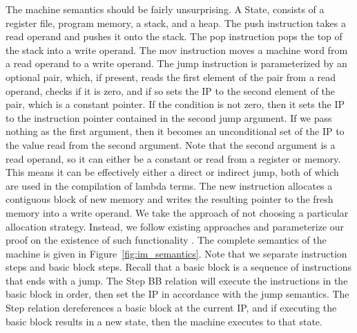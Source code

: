The machine semantics should be fairly unsurprising. A State, consists of a
register file, program memory, a stack, and a heap. The push instruction takes a
read operand and pushes it onto the stack. The pop instruction pops the
top of the stack into a write operand. The mov instruction moves a machine word
from a read operand to a write operand. The jump instruction is parameterized by
an optional pair, which, if present, reads the first element of the pair from a
read operand, checks if it is zero, and if so sets the IP to the second element
of the pair, which is a constant pointer. If the condition is not zero, then it
sets the IP to the instruction pointer contained in the second jump argument. If
we pass nothing as the first argument, then it becomes an unconditional set of
the IP to the value read from the second argument.  Note that the second
argument is a read operand, so it can either be a constant or read from a register
or memory. This means it can be effectively either a direct or indirect jump,
both of which are used in the compilation of lambda terms. The new instruction
allocates a contiguous block of new memory and writes the resulting pointer to
the fresh memory into a write operand. We take the approach of not choosing a
particular allocation strategy. Instead, we follow existing approaches and
parameterize our proof on the existence of such functionality
\cite{chlipala2007certified}. The complete semantics of the machine is given in
Figure~\ref{fig:im_semantics}.  Note that we separate instruction steps and
basic block steps. Recall that a basic block is a sequence of instructions that
ends with a jump. The Step BB relation will execute the instructions in the
basic block in order, then set the IP in accordance with the jump semantics. The
Step relation dereferences a basic block at the current IP, and if executing the
basic block results in a new state, then the machine executes to that state. 

